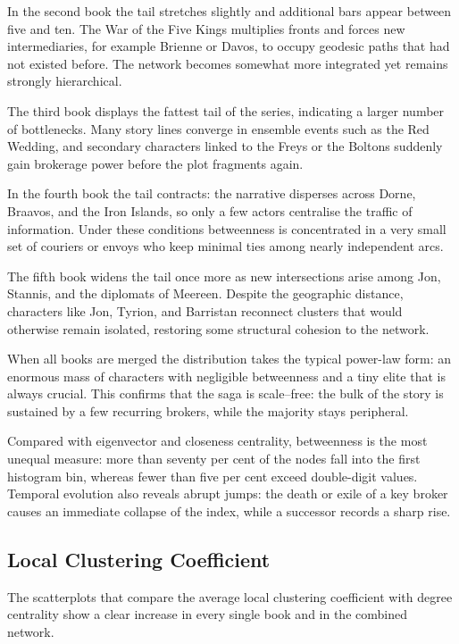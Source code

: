 \documentclass[12pt, a4paper]{article}
\begin{document}
In the second book the tail stretches slightly and additional bars appear between five and ten. The War of the Five Kings multiplies fronts and forces new intermediaries, for example Brienne or Davos, to occupy geodesic paths that had not existed before. The network becomes somewhat more integrated yet remains strongly hierarchical.

The third book displays the fattest tail of the series, indicating a larger number of bottlenecks. Many story lines converge in ensemble events such as the Red Wedding, and secondary characters linked to the Freys or the Boltons suddenly gain brokerage power before the plot fragments again.

In the fourth book the tail contracts: the narrative disperses across Dorne, Braavos, and the Iron Islands, so only a few actors centralise the traffic of information. Under these conditions betweenness is concentrated in a very small set of couriers or envoys who keep minimal ties among nearly independent arcs.

The fifth book widens the tail once more as new intersections arise among Jon, Stannis, and the diplomats of Meereen. Despite the geographic distance, characters like Jon, Tyrion, and Barristan reconnect clusters that would otherwise remain isolated, restoring some structural cohesion to the network.

When all books are merged the distribution takes the typical power-law form: an enormous mass of characters with negligible betweenness and a tiny elite that is always crucial. This confirms that the saga is scale–free: the bulk of the story is sustained by a few recurring brokers, while the majority stays peripheral.

Compared with eigenvector and closeness centrality, betweenness is the most unequal measure: more than seventy per cent of the nodes fall into the first histogram bin, whereas fewer than five per cent exceed double-digit values. Temporal evolution also reveals abrupt jumps: the death or exile of a key broker causes an immediate collapse of the index, while a successor records a sharp rise.

\subsection*{Local Clustering Coefficient}
The scatterplots that compare the average local clustering coefficient 
with degree centrality show a clear increase in every single book and in the combined network.
\end{document}
